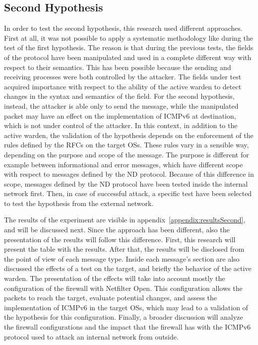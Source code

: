 \documentclass[12pt]{article}
\begin{document}
\subsection{Second Hypothesis}
\label{resultsSecondHypothesis}

In order to test the second hypothesis, this research used different approaches. First at all, it was not possible to apply a systematic methodology like during the test of the first hypothesis. The reason is that during the previous tests, the fields of the protocol have been manipulated and used in a complete different way with respect to their semantics. This has been possible because the sending and receiving processes were both controlled by the attacker. The fields under test acquired importance with respect to the ability of the active warden to detect changes in the syntax and semantics of the field. For the second hypothesis, instead, the attacker is able only to send the message, while the manipulated packet may have an effect on the implementation of ICMPv6 at destination, which is not under control of the attacker. In this context, in addition to the active warden, the validation of the hypothesis depends on the enforcement of the rules defined by the RFCs on the target OSs. These rules vary in a sensible way, depending on the purpose and scope of the message. The purpose is different for example between informational and error messages, which have different scope with respect to messages defined by the ND protocol. Because of this difference in scope, messages defined by the ND protocol have been tested inside the internal network first. Then, in case of successful attack, a specific test have been selected to test the hypothesis from the external network.

The results of the experiment are visible in appendix~\ref{appendix:resultsSecond}, and will be discussed next. Since the approach has been different, also the presentation of the results will follow this difference. First, this research will present the table with the results. After that, the results will be disclosed from the point of view of each message type. Inside each message's section are also discussed the effects of a test on the target, and briefly the behavior of the active warden. The presentation of the effects will take into account mostly the configuration of the firewall with Netfilter Open. This configuration allows the packets to reach the target, evaluate potential changes, and assess the implementation of ICMPv6 in the target OSs, which may lead to a validation of the hypothesis for this configuration. Finally, a broader discussion will analyze the firewall configurations and the impact that the firewall has with the ICMPv6 protocol used to attack an internal network from outside.
\end{document}
